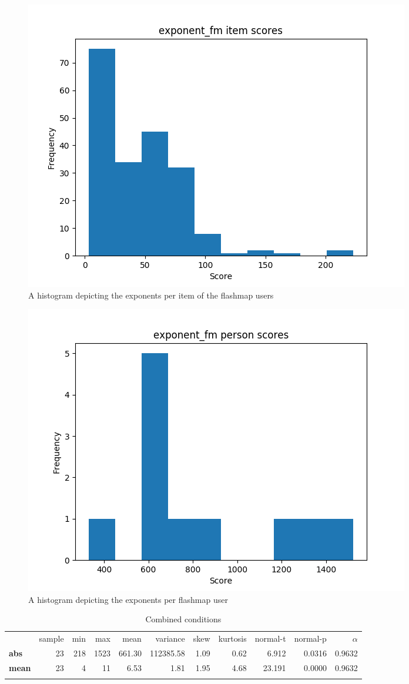 \begin{figure}
    \centering
    \includegraphics[width=.7\textwidth]{img/exponent_fm_diff.png}
    \caption{A histogram depicting the exponents per item of the flashmap users}
    \label{fig:exponent_fm_diff}
\end{figure}
\begin{figure}
    \centering
    \includegraphics[width=.7\textwidth]{img/exponent_fm_abil.png}
    \caption{A histogram depicting the exponents per flashmap user}
    \label{fig:exponent_fm_abil}
\end{figure}

\begin{longtable}[c]{@{}lrrrrrrrrrr@{}}
    \caption{Combined conditions}
    \endfirsthead
\toprule\addlinespace
& sample & min & max & mean & variance & skew & kurtosis & normal-t &
normal-p & $\alpha$
\\\addlinespace
\midrule
\textbf{abs} & 23 & 218 & 1523 & 661.30 & 112385.58 & 1.09 & 0.62 &
6.912 & 0.0316 & 0.9632
\\\addlinespace
\textbf{mean} & 23 & 4 & 11 & 6.53 & 1.81 & 1.95 & 4.68 & 23.191 &
0.0000 & 0.9632
\\\addlinespace
\bottomrule
    \label{tab:exponent_gen}
\end{longtable}

